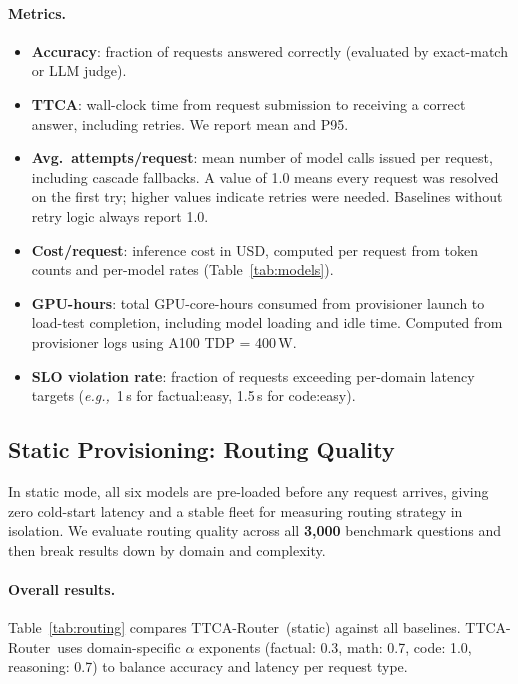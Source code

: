 \documentclass[11pt]{article}
\newcommand{\sysname}{TTCA-Router\xspace}
\newcommand{\ttca}{\textsc{TTCA}\xspace}
\newcommand{\eg}{\textit{e.g.,}\xspace}
\newcommand{\result}[1]{\textbf{#1}}
\begin{document}
\paragraph{Metrics.}
\begin{itemize}
  \item \textbf{Accuracy}: fraction of requests answered correctly
        (evaluated by exact-match or LLM judge).
  \item \textbf{\ttca}: wall-clock time from request submission to
        receiving a correct answer, including retries.
        We report mean and P95.
  \item \textbf{Avg.\ attempts/request}: mean number of model calls
        issued per request, including cascade fallbacks.
        A value of 1.0 means every request was resolved on the first
        try; higher values indicate retries were needed.
        Baselines without retry logic always report 1.0.
  \item \textbf{Cost/request}: inference cost in USD, computed per
        request from token counts and per-model rates
        (Table~\ref{tab:models}).
  \item \textbf{GPU-hours}: total GPU-core-hours consumed from
        provisioner launch to load-test completion, including model
        loading and idle time.  Computed from provisioner logs
        using A100 TDP = 400\,W.
  \item \textbf{SLO violation rate}: fraction of requests exceeding
        per-domain latency targets
        (\eg\ 1\,s for factual:easy, 1.5\,s for code:easy).
\end{itemize}

\subsection{Static Provisioning: Routing Quality}
\label{sec:eval:static}

In static mode, all six models are pre-loaded before any request
arrives, giving zero cold-start latency and a stable fleet for
measuring routing strategy in isolation.
We evaluate routing quality across all \result{3{,}000} benchmark
questions and then break results down by domain and complexity.

\paragraph{Overall results.}
Table~\ref{tab:routing} compares \sysname\ (static) against all baselines.
\sysname\ uses domain-specific $\alpha$ exponents
(factual: 0.3, math: 0.7, code: 1.0, reasoning: 0.7) to balance
accuracy and latency per request type.
\end{document}

